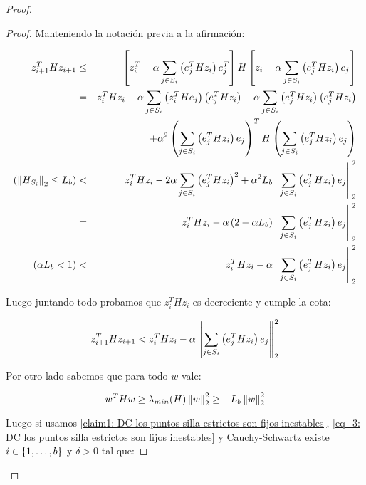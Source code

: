 \begin{proof}
	\begin{proof}
		Manteniendo la notaci\'on previa a la afirmaci\'on:
		
		\begin{equation*}
		\begin{aligned}
			z_{i+1}^THz_{i+1} & \leq & \left[z_i^T - \alpha \sum\limits_{j \in S_i}{\left( e_j^T H z_i \right) e_j^T} \right]H \left[ z_i - \alpha \sum\limits_{j \in S_i}{\left(e_j^T H z_i \right) e_j }\right] \\
			& = & z_i^T H z_i - \alpha \sum\limits_{j \in S_i}{\left(z_i^T H e_j\right)\left(e_j^T H z_i\right)} - \alpha \sum\limits_{j \in S_i}{\left(e_j^T H z_i\right)\left(e_j^T H z_i\right)} \\
			&& + \alpha^2 \left(\sum\limits_{j \in S_i}{\left(e_j^T H z_i\right)e_j}\right)^TH\left(\sum\limits_{j \in S_i}{\left(e_j^T H z_i\right)e_j}\right) \\
			\left(\left\lVert H_{S_i}\right\rVert_2 \leq L_b\right) & < & z_i^T H z_i -  2\alpha \sum\limits_{j \in S_i}{\left(e_j^T H z_i\right)^2 } + \alpha ^2 L_b \left\lVert\sum\limits_{j \in S_i}{\left(e_j^T H z_i\right)e_j}\right\rVert^2_2 \\
		    & = & z_i^T H z_i -  \alpha \left(2 - \alpha L_b\right)\left\lVert\sum\limits_{j \in S_i}{\left(e_j^T H z_i\right)e_j}\right\rVert^2_2 \\
			\left(\alpha L_b < 1\right) & < & z_i^T H z_i -  \alpha \left\lVert\sum\limits_{j \in S_i}{\left(e_j^T H z_i\right)e_j}\right\rVert^2_2 
		\end{aligned} 
		\end{equation*}
		
		Luego juntando todo probamos que $z_i^T H z_i$ es decreciente y cumple la cota:
		
		\begin{equation}
		\label{eq_2: DC los puntos silla estrictos son fijos inestables}
			z_{i+1}^THz_{i+1}  < z_i^T H z_i -  \alpha \left\lVert\sum\limits_{j \in S_i}{\left(e_j^T H z_i\right)e_j}\right\rVert^2_2 
		\end{equation}
		
		Por otro lado sabemos que para todo $w$ vale:
		
		\begin{equation}
		\label{eq_3: DC los puntos silla estrictos son fijos inestables}
			w^THw  \geq  \lambda_{min}(H) \left\lVert w\right\rVert_2^2 \geq -L_b \left\lVert w\right\rVert^2_2
		\end{equation}
		
		
		Luego si usamos \ref{claim1: DC los puntos silla estrictos son fijos inestables}, \ref{eq_3: DC los puntos silla estrictos son fijos inestables} y Cauchy-Schwartz existe $i \in \left\lbrace1, \dots, b\right\rbrace$ y $\delta >0$ tal que:
		

\end{proof}
\end{proof}
